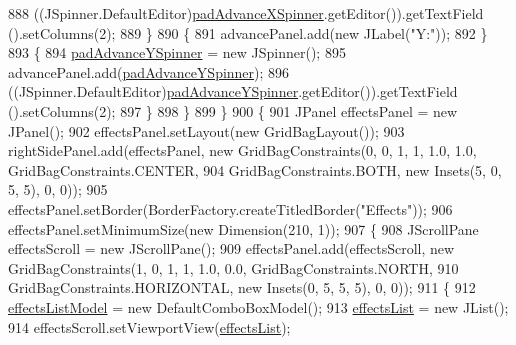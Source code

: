 \begin{DoxyCode}
888                     ((JSpinner.DefaultEditor)\mbox{\hyperlink{classorg_1_1newdawn_1_1slick_1_1tools_1_1hiero_1_1_hiero_afd022869253bd23ee0daf1f0f06966ae}{padAdvanceXSpinner}}.getEditor()).getTextField
      ().setColumns(2);
889                 \}
890                 \{
891                     advancePanel.add(\textcolor{keyword}{new} JLabel(\textcolor{stringliteral}{"Y:"}));
892                 \}
893                 \{
894                     \mbox{\hyperlink{classorg_1_1newdawn_1_1slick_1_1tools_1_1hiero_1_1_hiero_a5d9233b804a0a3506880e5ff43dddcad}{padAdvanceYSpinner}} = \textcolor{keyword}{new} JSpinner();
895                     advancePanel.add(\mbox{\hyperlink{classorg_1_1newdawn_1_1slick_1_1tools_1_1hiero_1_1_hiero_a5d9233b804a0a3506880e5ff43dddcad}{padAdvanceYSpinner}});
896                     ((JSpinner.DefaultEditor)\mbox{\hyperlink{classorg_1_1newdawn_1_1slick_1_1tools_1_1hiero_1_1_hiero_a5d9233b804a0a3506880e5ff43dddcad}{padAdvanceYSpinner}}.getEditor()).getTextField
      ().setColumns(2);
897                 \}
898             \}
899         \}
900         \{
901             JPanel effectsPanel = \textcolor{keyword}{new} JPanel();
902             effectsPanel.setLayout(\textcolor{keyword}{new} GridBagLayout());
903             rightSidePanel.add(effectsPanel, \textcolor{keyword}{new} GridBagConstraints(0, 0, 1, 1, 1.0, 1.0, 
      GridBagConstraints.CENTER,
904                 GridBagConstraints.BOTH, \textcolor{keyword}{new} Insets(5, 0, 5, 5), 0, 0));
905             effectsPanel.setBorder(BorderFactory.createTitledBorder(\textcolor{stringliteral}{"Effects"}));
906             effectsPanel.setMinimumSize(\textcolor{keyword}{new} Dimension(210, 1));
907             \{
908                 JScrollPane effectsScroll = \textcolor{keyword}{new} JScrollPane();
909                 effectsPanel.add(effectsScroll, \textcolor{keyword}{new} GridBagConstraints(1, 0, 1, 1, 1.0, 0.0, 
      GridBagConstraints.NORTH,
910                     GridBagConstraints.HORIZONTAL, \textcolor{keyword}{new} Insets(0, 5, 5, 5), 0, 0));
911                 \{
912                     \mbox{\hyperlink{classorg_1_1newdawn_1_1slick_1_1tools_1_1hiero_1_1_hiero_ace6d63639e4675334744afbdad439e98}{effectsListModel}} = \textcolor{keyword}{new} DefaultComboBoxModel();
913                     \mbox{\hyperlink{classorg_1_1newdawn_1_1slick_1_1tools_1_1hiero_1_1_hiero_aff0431ced360227e02cdf9bcd21fd4d2}{effectsList}} = \textcolor{keyword}{new} JList();
914                     effectsScroll.setViewportView(\mbox{\hyperlink{classorg_1_1newdawn_1_1slick_1_1tools_1_1hiero_1_1_hiero_aff0431ced360227e02cdf9bcd21fd4d2}{effectsList}});

\end{DoxyCode}
